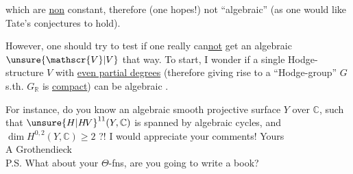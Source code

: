which are \uline{non} constant, therefore (one hopes!) not ``algebraic'' (as one would like Tate's conjectures to hold).

However, one should try to test if one really can\uline{not} get an algebraic $\unsure{\mathscr{V}|V}$ that way. To start, I wonder if a single Hodge-structure $V$ with \uline{even partial degrees} (therefore giving rise to a ``Hodge-group'' $G$ s.th. $G_{\mathbb{R}}$ is \uline{compact}) can be algebraic .

For instance, do you know an algebraic smooth projective surface $Y$ over $\mathbb{C}$, such that ${\unsure{H|H\!V}}^{11}(Y,\mathbb{C})$ is spanned by algebraic cycles, and $\dim H^{0,2}(Y,\mathbb{C})\geq 2$ ?! I would appreciate your comments! \quad Yours\\
A Grothendieck\\

P.S. What about your $\Theta$-fns, are you going to write a book?
